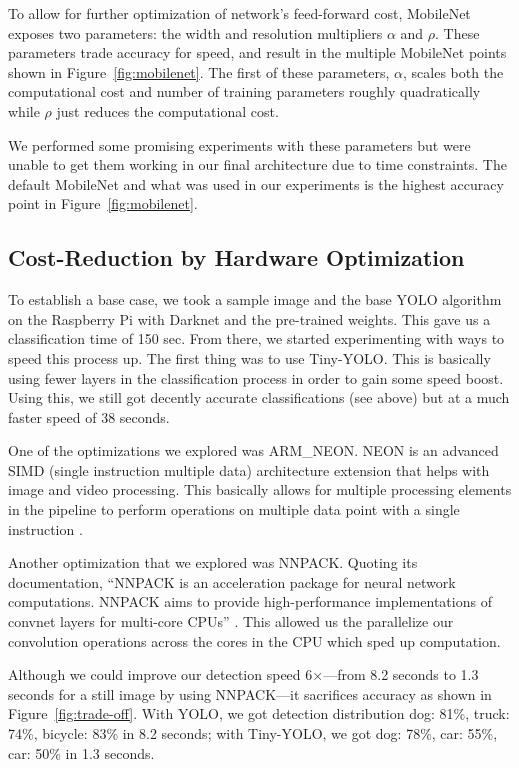 \documentclass{article}
\begin{document}
To allow for further optimization of network's feed-forward cost, MobileNet exposes two parameters: the width and resolution multipliers $\alpha$ and $\rho$. These parameters trade accuracy for speed, and result in the multiple MobileNet points shown in Figure~\ref{fig:mobilenet}. The first of these parameters, $\alpha$, scales both the computational cost and number of training parameters roughly quadratically while $\rho$ just reduces the computational cost. 

We performed some promising experiments with these parameters but were unable to get them working in our final architecture due to time constraints. The default MobileNet and what was used in our experiments is the highest accuracy point in Figure~\ref{fig:mobilenet}.

\subsection{Cost-Reduction by Hardware Optimization}

To establish a base case, we took a sample image and the base YOLO algorithm on the Raspberry Pi with Darknet and the pre-trained weights. This gave us a classification time of 150 sec. From there, we started experimenting with ways to speed this process up. The first thing was to use Tiny-YOLO. This is basically using fewer layers in the classification process in order to gain some speed boost. Using this, we still got decently accurate classifications (see above) but at a much faster speed of 38 seconds.

One of the optimizations we explored was ARM\_NEON. NEON is an advanced SIMD (single instruction multiple data) architecture extension that helps with image and video processing. This basically allows for multiple processing elements in the pipeline to perform operations on multiple data point with a single instruction \cite{NEON}.

Another optimization that we explored was NNPACK. Quoting its documentation, ``NNPACK is an acceleration package for neural network computations. NNPACK aims to provide high-performance implementations of convnet layers for multi-core CPUs'' \cite{NNPACK}. This allowed us the parallelize our convolution operations across the cores in the CPU which sped up computation.

Although we could improve our detection speed 6$\times$---from 8.2 seconds to 1.3 seconds for a still image by using NNPACK---it sacrifices accuracy as shown in Figure~\ref{fig:trade-off}. With YOLO, we got detection distribution dog: 81\%, truck: 74\%, bicycle: 83\% in 8.2 seconds; with Tiny-YOLO, we got dog: 78\%, car: 55\%, car: 50\% in 1.3 seconds.
\end{document}
